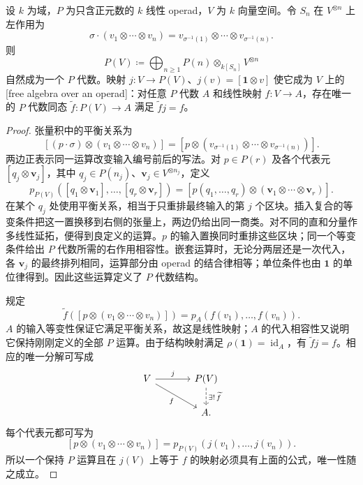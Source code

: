 \begin{proposition}\label{b4:prop:free-operad-algebra}
	设 \(k\) 为域，\(P\) 为只含正元数的 \(k\) 线性 operad，\(V\) 为 \(k\) 向量空间。令 \(S_n\) 在 \(V^{\otimes n}\) 上左作用为
	\[
		\sigma\cdot(v_1\otimes\cdots\otimes v_n)
		=v_{\sigma^{-1}(1)}\otimes\cdots\otimes v_{\sigma^{-1}(n)}.
	\]
	则
	\[
		P(V)\coloneqq\bigoplus_{n\geq1}P(n)\otimes_{k[S_n]}V^{\otimes n}
	\]
	自然成为一个 \(P\) 代数。映射 \(j:V\rightarrow P(V)\)、\(j(v)=[\mathbf1\otimes v]\) 使它成为 \(V\) 上的[free algebra over an operad]：对任意 \(P\) 代数 \(A\) 和线性映射 \(f:V\rightarrow A\)，存在唯一的 \(P\) 代数同态 \(\widetilde f:P(V)\rightarrow A\) 满足 \(\widetilde f j=f\)。
\end{proposition}
\begin{proof}
	张量积中的平衡关系为
	\[
		[(p\cdot\sigma)\otimes(v_1\otimes\cdots\otimes v_n)]
		=[p\otimes(v_{\sigma^{-1}(1)}\otimes\cdots\otimes v_{\sigma^{-1}(n)})].
	\]
	两边正表示同一运算改变输入编号前后的写法。对 \(p\in P(r)\) 及各个代表元 \([q_j\otimes\mathbf v_j]\)，其中 \(q_j\in P(n_j)\)、\(\mathbf v_j\in V^{\otimes n_j}\)，定义
	\[
		p_{P(V)}([q_1\otimes\mathbf v_1],\ldots,[q_r\otimes\mathbf v_r])
		=[p(q_1,\ldots,q_r)\otimes(\mathbf v_1\otimes\cdots\otimes\mathbf v_r)].
	\]
	在某个 \(q_j\) 处使用平衡关系，相当于只重排最终输入的第 \(j\) 个区块。插入复合的等变条件把这一置换移到右侧的张量上，两边仍给出同一商类。对不同的直和分量作多线性延拓，便得到良定义的运算。\(p\) 的输入置换同时重排这些区块；同一个等变条件给出 \(P\) 代数所需的右作用相容性。嵌套运算时，无论分两层还是一次代入，各 \(\mathbf v_j\) 的最终排列相同，运算部分由 operad 的结合律相等；单位条件也由 \(\mathbf1\) 的单位律得到。因此这些运算定义了 \(P\) 代数结构。

	规定
	\[
		\widetilde f([p\otimes(v_1\otimes\cdots\otimes v_n)])
		=p_A(f(v_1),\ldots,f(v_n)).
	\]
	\(A\) 的输入等变性保证它满足平衡关系，故这是线性映射；\(A\) 的代入相容性又说明它保持刚刚定义的全部 \(P\) 运算。由于结构映射满足 \(\rho(\mathbf1)=\operatorname{id}_A\)，有 \(\widetilde f j=f\)。相应的唯一分解可写成
	\[
		\begin{tikzcd}[column sep=large]
			V\arrow[r,"j"]\arrow[dr,"f"']&P(V)\arrow[d,dashed,"\exists!\,\widetilde f"]\\
			&A.
		\end{tikzcd}
	\]
	每个代表元都可写为
	\[
		[p\otimes(v_1\otimes\cdots\otimes v_n)]
		=p_{P(V)}(j(v_1),\ldots,j(v_n)).
	\]
	所以一个保持 \(P\) 运算且在 \(j(V)\) 上等于 \(f\) 的映射必须具有上面的公式，唯一性随之成立。
\end{proof}

